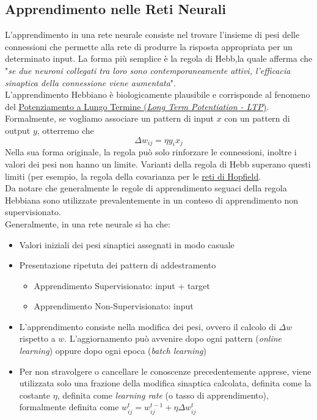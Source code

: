\documentclass[12pt, a4paper]{article}
\begin{document}
\subsection{Apprendimento nelle Reti Neurali}
L'apprendimento in una rete neurale consiste nel trovare l'insieme di pesi delle connessioni che permette alla rete di produrre la risposta appropriata per un determinato input. La forma più semplice è la regola di Hebb,la quale afferma che "\textit{se due neuroni collegati tra loro sono contemporaneamente attivi, l'efficacia sinaptica della connessione viene aumentata}".\\
L'apprendimento Hebbiano è biologicamente plausibile e corrisponde al fenomeno del \href{https://it.wikipedia.org/wiki/Long_term_potentiation}{Potenziamento a Lungo Termine (\textit{Long Term Potentiation - LTP})}.\\
Formalmente, se vogliamo associare un pattern di input \(x\) con un pattern di output \(y\), otterremo che \[\Delta w_{ij} = \eta y_ix_j\]
Nella sua forma originale, la regola può solo rinforzare le connessioni, inoltre i valori dei pesi non hanno un limite. Varianti della regola di Hebb superano questi limiti (per esempio, la regola della covarianza per le \href{https://it.wikipedia.org/wiki/Rete_di_Hopfield}{reti di Hopfield}.\\
Da notare che generalmente le regole di apprendimento seguaci della regola Hebbiana sono utilizzate prevalentemente in un conteso di apprendimento non supervisionato.\\
Generalmente, in una rete neurale si ha che:
\begin{itemize}
    \item Valori iniziali dei pesi sinaptici assegnati in modo casuale
    \item Presentazione ripetuta dei pattern di addestramento
    \begin{itemize}
        \item Apprendimento Supervisionato: input + target
        \item Apprendimento Non-Supervisionato: input
    \end{itemize}
    \item L'apprendimento consiste nella modifica dei pesi, ovvero il calcolo di \(\Delta w\) rispetto a \(w\). L'aggiornamento può avvenire dopo ogni pattern (\textit{online learning}) oppure dopo ogni epoca (\textit{batch learning})
    \item Per non stravolgere o cancellare le conoscenze precedentemente apprese, viene utilizzata solo una frazione della modifica sinaptica calcolata, definita come la costante \(\eta\), definita come \textit{learning rate} (o tasso di apprendimento), formalmente definita come \(w^t_{ij}=w^{t-1}_{ij}+\eta \Delta w^t_{ij}\)
\end{itemize}
\end{document}

